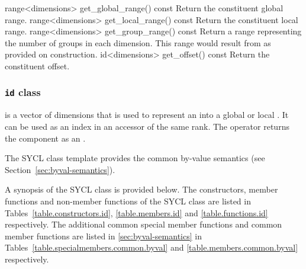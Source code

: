   \addRow
    {range<dimensions> get_global_range() const}
    {
        Return the constituent global range.
    }
  \addRow
    {range<dimensions> get_local_range() const}
    {
        Return the constituent local range.
    }
  \addRow
    {range<dimensions> get_group_range() const}
    {
        Return a range representing the number of groups in each
        dimension.  This range would result from
         as provided on construction.
    }
  \addRow
    {id<dimensions> get_offset() const}
    {
        Return the constituent offset.
    }
 \completeTable

\subsubsection{\texttt{id} class}
\label{id-class}

 is a vector of dimensions that is used to
represent an  into a global or local
. It can be used as an index in an accessor of the
same rank. The \tf{[n]} operator returns the component  as an
.

The SYCL  class template provides the common by-value semantics
(see Section~\ref{sec:byval-semantics}).

A synopsis of the SYCL  class is provided below. The constructors, member functions and non-member functions of the SYCL  class are listed in Tables~\ref{table.constructors.id}, \ref{table.members.id} and \ref{table.functions.id} respectively. The additional common special member functions and common member functions are listed in \ref{sec:byval-semantics} in Tables~\ref{table.specialmembers.common.byval} and \ref{table.members.common.byval} respectively.



